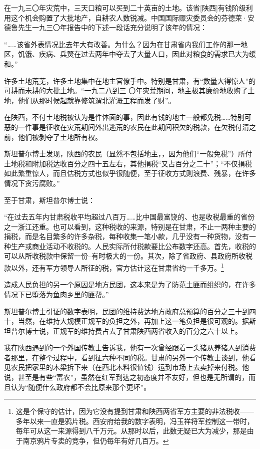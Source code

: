 \documentclass[10pt]{book}
\begin{document}
在一九三〇年灾荒中，三天口粮可以买到二十英亩的土地。该省[陕西]有钱阶级利用这个机会购置了大批地产，自耕农人数锐减。中国国际赈灾委员会的芬德莱·安德鲁先生一九三〇年报告中的下述一段话充分说明了该年的情况：

“……该省外表情况比去年大有改善。为什么？因为在甘肃省内我们工作的那一地区，饥饿、疾病、兵燹在过去两年中夺去了大量人口，因此对粮食的需求已大为缓和。”

许多土地荒芜，许多土地集中在地主官僚手中。特别是甘肃，有“数量大得惊人”的可耕而未耕的大批土地。“一九二八到三 〇年灾荒期间，地主极其廉价地收购了土地，他们从那时候起就靠修筑渭北灌溉工程而发了财”。

在陕西，不付土地税被认为是件体面的事，因此有钱的地主一般都免税……特别可恶的一件事是征收在灾荒期间外出逃荒的农民在此期间积欠的税款，在欠税付清之前，他们被剥夺了土地所有权。

斯坦普尔博士发现，陕西的农民（显然不包括地主，，因为他们“一般免税”）所付土地税和附加税达收百分之四十五左右，其他捐税“又占百分之二十”；“不仅捐税如此繁重惊人，而且估税方式也似乎很随便，至于征收方式则浪费、残暴，在许多情况下贪污腐败。”

至于甘肃，斯坦普尔博士说：

“在过去五年内甘肃税收平均超过八百万……比中国最富饶的、也是收税最重的省份之一浙江还重。也可以看到，这种税收的来源，特别是在甘肃，不止一两种主要的捐税，而是名目繁多的许多杂税，每种收集一笔小款，几乎没有一种货物，没有一种生产或商业活动不收税的。人民实际所付税款要比公布数字还高。首先，收税的可以从所收税款中保留一份--有时极大的一份。其次，除了省政府、县政府所收税款以外，还有军方领导人所征的税，官方估计这在甘肃省约一千多万。\footnote{这是个保守的估计，因为它没有提到甘肃和陕西两省军方主要的非法税收——多年以来一直是鸦片税。西安府给我的数字表明，冯玉祥将军控制这一带时，每年可从这一来源得到八千万元。从那时以后，此数无疑已大为减少，那是由于南京鸦片专卖的竞争，但仍每年有好几百万。}

造成人民负担的另一个原因是地方民团，这本来是为了防范土匪而组织的，在许多情况下已堕落为鱼肉乡里的匪帮。”

斯坦普尔博士引证的数字表明，民团的维持费达地方政府总预算的百分之三十到四十，当然，在维持大规模正规军的负担之外，再加上这一笔负担是很可观的。据斯坦普尔博士说，正规军的维持费占去了甘肃陕西两省收入的百分之六十以上。

我在陕西遇到的一个外国传教士告诉我，他有一次曾经跟着一头猪从养猪人到消费者那里，在整个过程中，看到征六种不同的税。甘肃的另外一个传教士谈到，他看见农民把家里的木梁拆下来（在西北木料很值钱）运到市场上去卖掉来付税。他说，甚至是有些“富农”，虽然在红军到达之初态度并不友好，但也是无所谓的，而且认为“随便什么政府都不会比原来那个更坏”。
\end{document}
